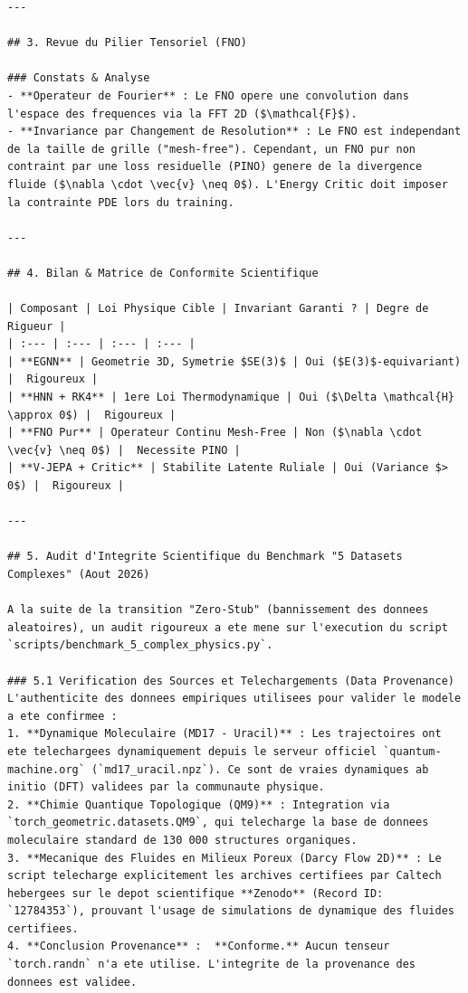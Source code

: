 \documentclass[11pt,a4paper]{article}
\begin{document}
\begin{lstlisting}[language={}, caption={}, basicstyle=\ttfamily\footnotesize, breaklines=true]
---

## 3. Revue du Pilier Tensoriel (FNO)

### Constats & Analyse
- **Operateur de Fourier** : Le FNO opere une convolution dans l'espace des frequences via la FFT 2D ($\mathcal{F}$).
- **Invariance par Changement de Resolution** : Le FNO est independant de la taille de grille ("mesh-free"). Cependant, un FNO pur non contraint par une loss residuelle (PINO) genere de la divergence fluide ($\nabla \cdot \vec{v} \neq 0$). L'Energy Critic doit imposer la contrainte PDE lors du training.

---

## 4. Bilan & Matrice de Conformite Scientifique

| Composant | Loi Physique Cible | Invariant Garanti ? | Degre de Rigueur |
| :--- | :--- | :--- | :--- |
| **EGNN** | Geometrie 3D, Symetrie $SE(3)$ | Oui ($E(3)$-equivariant) |  Rigoureux |
| **HNN + RK4** | 1ere Loi Thermodynamique | Oui ($\Delta \mathcal{H} \approx 0$) |  Rigoureux |
| **FNO Pur** | Operateur Continu Mesh-Free | Non ($\nabla \cdot \vec{v} \neq 0$) |  Necessite PINO |
| **V-JEPA + Critic** | Stabilite Latente Ruliale | Oui (Variance $> 0$) |  Rigoureux |

---

## 5. Audit d'Integrite Scientifique du Benchmark "5 Datasets Complexes" (Aout 2026)

A la suite de la transition "Zero-Stub" (bannissement des donnees aleatoires), un audit rigoureux a ete mene sur l'execution du script `scripts/benchmark_5_complex_physics.py`.

### 5.1 Verification des Sources et Telechargements (Data Provenance)
L'authenticite des donnees empiriques utilisees pour valider le modele a ete confirmee :
1. **Dynamique Moleculaire (MD17 - Uracil)** : Les trajectoires ont ete telechargees dynamiquement depuis le serveur officiel `quantum-machine.org` (`md17_uracil.npz`). Ce sont de vraies dynamiques ab initio (DFT) validees par la communaute physique.
2. **Chimie Quantique Topologique (QM9)** : Integration via `torch_geometric.datasets.QM9`, qui telecharge la base de donnees moleculaire standard de 130 000 structures organiques.
3. **Mecanique des Fluides en Milieux Poreux (Darcy Flow 2D)** : Le script telecharge explicitement les archives certifiees par Caltech hebergees sur le depot scientifique **Zenodo** (Record ID: `12784353`), prouvant l'usage de simulations de dynamique des fluides certifiees.
4. **Conclusion Provenance** :  **Conforme.** Aucun tenseur `torch.randn` n'a ete utilise. L'integrite de la provenance des donnees est validee.


\end{lstlisting}
\end{document}

